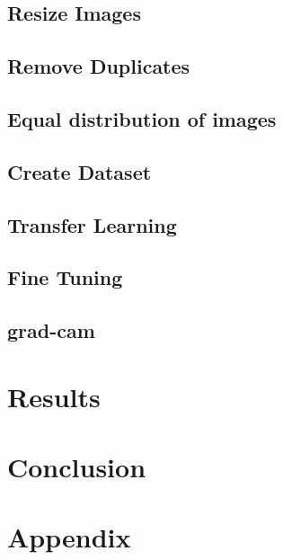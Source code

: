 \documentclass{scrartcl}
\begin{document}
		\subsection{Resize Images}
		\label{chap:resize-images}
		

		\subsection{Remove Duplicates}
		\label{chap:remove-duplicates}
		

		\subsection{Equal distribution of images}
		\label{chap:equal-distribution}
		

		\subsection{Create Dataset}
		\label{chap:create-dataset}
		

		\clearpage
		\subsection{Transfer Learning}
		\label{chap:transfer-learning}
		

		\subsection{Fine Tuning}
		\label{chap:fine-tuning}
		

		\clearpage
		\subsection{\ac{grad-cam}}
		\label{chap:grad-cam}
		
	\clearpage
	\section{Results}
	\label{chap:results}
	
	\clearpage
	\section{Conclusion}
	\label{chap:conclusion}
		

	\clearpage
	\listoffigures


	\clearpage
	\listoftables
	\clearpage
	\printbibliography
	\clearpage
	\section{Appendix}
	\label{chap:appendix}
		
\end{document}
